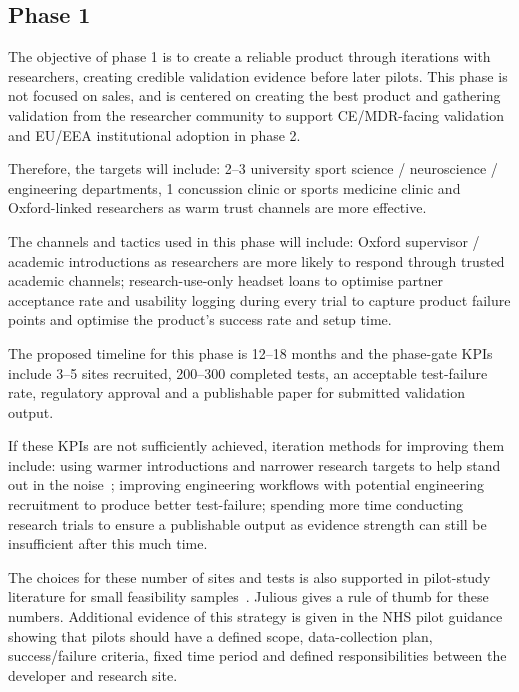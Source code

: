 \subsection{Phase 1}

The objective of phase 1 is to create a reliable product through iterations with researchers, creating credible validation evidence before later pilots. This phase is not focused on sales, and is centered on creating the best product and gathering validation from the researcher community to support CE/MDR-facing validation and EU/EEA institutional adoption in phase 2.

Therefore, the targets will include: 2--3 university sport science / neuroscience / engineering departments, 1 concussion clinic or sports medicine clinic and Oxford-linked researchers as warm trust channels are more effective.

The channels and tactics used in this phase will include: Oxford supervisor / academic introductions as researchers are more likely to respond through trusted academic channels; research-use-only headset loans to optimise partner acceptance rate and usability logging during every trial to capture product failure points and optimise the product's success rate and setup time.

The proposed timeline for this phase is 12--18 months and the phase-gate KPIs include 3--5 sites recruited, 200--300 completed tests, an acceptable test-failure rate, regulatory approval and a publishable paper for submitted validation output.

If these KPIs are not sufficiently achieved, iteration methods for improving them include: using warmer introductions and narrower research targets to help stand out in the noise~\cite{blank2013startup}; improving engineering workflows with potential engineering recruitment to produce better test-failure; spending more time conducting research trials to ensure a publishable output as evidence strength can still be insufficient after this much time.

The choices for these number of sites and tests is also supported in pilot-study literature for small feasibility samples~\cite{julious2005pilot}. Julious gives a rule of thumb for these numbers. Additional evidence of this strategy is given in the NHS pilot guidance~\cite{ohid2020digitalhealth} showing that pilots should have a defined scope, data-collection plan, success/failure criteria, fixed time period and defined responsibilities between the developer and research site.

